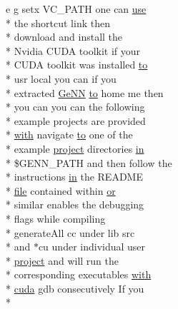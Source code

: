 \begin{DoxyCompactItemize}
\item 
e g setx V\+C\+\_\+\+P\+A\+T\+H one can \hyperlink{README_8txt_acf386c48a14a2099c9220d6bcde40fc8}{use} \\*
the shortcut link then \\*
download and install the \\*
Nvidia C\+U\+D\+A toolkit if your \\*
C\+U\+D\+A toolkit was installed \hyperlink{README_8txt_add1f2ee32acc15ef77f839d4382c9768}{to} \\*
usr local you can if you \\*
extracted \hyperlink{README_8txt_a431a8d9aae97c72793fee7c3edd68559}{Ge\+N\+N} \hyperlink{README_8txt_add1f2ee32acc15ef77f839d4382c9768}{to} home me then \\*
you can you can the following \\*
example projects are provided \\*
\hyperlink{userproject_2OneComp__project_2README_8txt_ace09bb40fbf4457ad9a9340a67a4fa9a}{with} navigate \hyperlink{README_8txt_add1f2ee32acc15ef77f839d4382c9768}{to} one of the \\*
example \hyperlink{userproject_2SynDelay__project_2README_8txt_a762c750134e07a31b7965860fd292b51}{project} directories \hyperlink{README_8txt_a148897a6b2cc9cff25af80abb13426b0}{in} \\*
\$G\+E\+N\+N\+\_\+\+P\+A\+T\+H and then follow the \\*
instructions \hyperlink{README_8txt_a148897a6b2cc9cff25af80abb13426b0}{in} the R\+E\+A\+D\+M\+E \\*
\hyperlink{README_8txt_a6f45b2930c1b79b67034355b4701dc56}{file} contained within \hyperlink{userproject_2PoissonIzh__project_2README_8txt_ad4021097ab0ba066271614bf3f4c2e27}{or} \\*
similar enables the debugging \\*
flags while compiling \\*
generate\+All cc under lib src \\*
and $\ast$cu under individual user \\*
\hyperlink{userproject_2SynDelay__project_2README_8txt_a762c750134e07a31b7965860fd292b51}{project} and will run the \\*
corresponding executables \hyperlink{userproject_2OneComp__project_2README_8txt_ace09bb40fbf4457ad9a9340a67a4fa9a}{with} \\*
\hyperlink{README_8txt_a386e5818501e36b046e9cf9ee9a1a6b0}{cuda} gdb consecutively If you \\*

\end{DoxyCompactItemize}
